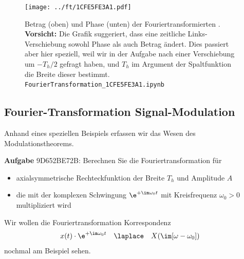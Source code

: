 %
\begin{figure}[h!]
\texttt{[image: ../ft/1CFE5FE3A1.pdf]}
  \caption{Betrag (oben) und Phase (unten) der Fouriertransformierten .
\textbf{Vorsicht:} Die Grafik suggeriert, dass eine zeitliche Links-Verschiebung
sowohl Phase als auch Betrag ändert. Dies passiert aber hier speziell, weil wir in der
Aufgabe nach einer Verschiebung um $-T_h/2$ gefragt haben, und $T_h$
im Argument der Spaltfunktion die Breite dieser bestimmt.
\texttt{FourierTransformation\_1CFE5FE3A1.ipynb}}
  \label{fig:1CFE5FE3A1}
\end{figure}





\clearpage
\subsection{Fourier-Transformation Signal-Modulation}
\label{sec:9D652BE72B}
\begin{Ziel}
Anhand eines speziellen Beispiels erfassen wir das Wesen des Modulationstheorems.
\end{Ziel}
\textbf{Aufgabe} {\tiny 9D652BE72B}: Berechnen Sie die Fouriertransformation für
\begin{itemize}
\item axialsymmetrische Rechteckfunktion der Breite $T_h$ und Amplitude $A$
\item die mit der komplexen Schwingung $\e^{+\im \omega_0 t}$ mit Kreisfrequenz $\omega_0>0$
multipliziert wird
\end{itemize}
Wir wollen die Fouriertransformation Korrespondenz 
\begin{align}
x(t) \cdot \e^{+\im\omega_0 t} & \quad \laplace \quad X(\im[\omega-\omega_0])
\end{align}
nochmal am Beispiel sehen.

\begin{figure}[h!]
\centering
{}
\end{figure}

